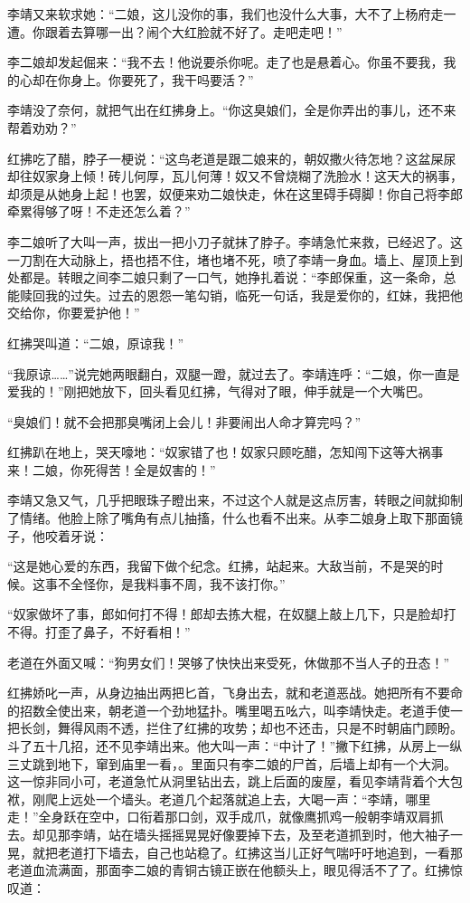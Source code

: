 李靖又来软求她：“二娘，这儿没你的事，我们也没什么大事，大不了上杨府走一遭。你跟着去算哪一出？闹个大红脸就不好了。走吧走吧！”

李二娘却发起倔来：“我不去！他说要杀你呢。走了也是悬着心。你虽不要我，我的心却在你身上。你要死了，我干吗要活？”

李靖没了奈何，就把气出在红拂身上。“你这臭娘们，全是你弄出的事儿，还不来帮着劝劝？”

红拂吃了醋，脖子一梗说：“这鸟老道是跟二娘来的，朝奴撒火待怎地？这盆屎尿却往奴家身上倾！砖儿何厚，瓦儿何薄！奴又不曾烧糊了洗脸水！这天大的祸事，却须是从她身上起！也罢，奴便来劝二娘快走，休在这里碍手碍脚！你自己将李郎牵累得够了呀！不走还怎么着？”

李二娘听了大叫一声，拔出一把小刀子就抹了脖子。李靖急忙来救，已经迟了。这一刀割在大动脉上，捂也捂不住，堵也堵不死，喷了李靖一身血。墙上、屋顶上到处都是。转眼之间李二娘只剩了一口气，她挣扎着说：“李郎保重，这一条命，总能赎回我的过失。过去的恩怨一笔勾销，临死一句话，我是爱你的，红妹，我把他交给你，你要爱护他！”

红拂哭叫道：“二娘，原谅我！”

“我原谅……”说完她两眼翻白，双腿一蹬，就过去了。李靖连呼：“二娘，你一直是爱我的！”刚把她放下，回头看见红拂，气得对了眼，伸手就是一个大嘴巴。

“臭娘们！就不会把那臭嘴闭上会儿！非要闹出人命才算完吗？”

红拂趴在地上，哭天嚎地：“奴家错了也！奴家只顾吃醋，怎知闯下这等大祸事来！二娘，你死得苦！全是奴害的！”

李靖又急又气，几乎把眼珠子瞪出来，不过这个人就是这点厉害，转眼之间就抑制了情绪。他脸上除了嘴角有点儿抽搐，什么也看不出来。从李二娘身上取下那面镜子，他咬着牙说：

“这是她心爱的东西，我留下做个纪念。红拂，站起来。大敌当前，不是哭的时候。这事不全怪你，是我料事不周，我不该打你。”

“奴家做坏了事，郎如何打不得！郎却去拣大棍，在奴腿上敲上几下，只是脸却打不得。打歪了鼻子，不好看相！”

老道在外面又喊：“狗男女们！哭够了快快出来受死，休做那不当人子的丑态！”

红拂娇叱一声，从身边抽出两把匕首，飞身出去，就和老道恶战。她把所有不要命的招数全使出来，朝老道一个劲地猛扑。嘴里喝五吆六，叫李靖快走。老道手使一把长剑，舞得风雨不透，拦住了红拂的攻势；却也不还击，只是不时朝庙门顾盼。斗了五十几招，还不见李靖出来。他大叫一声：“中计了！”撇下红拂，从房上一纵三丈跳到地下，窜到庙里一看，。里面只有李二娘的尸首，后墙上却有一个大洞。这一惊非同小可，老道急忙从洞里钻出去，跳上后面的废屋，看见李靖背着个大包袱，刚爬上远处一个墙头。老道几个起落就追上去，大喝一声：“李靖，哪里走！”全身跃在空中，口衔着那口剑，双手成爪，就像鹰抓鸡一般朝李靖双肩抓去。却见那李靖，站在墙头摇摇晃晃好像要掉下去，及至老道抓到时，他大袖子一晃，就把老道打下墙去，自己也站稳了。红拂这当儿正好气喘吁吁地追到，一看那老道血流满面，那面李二娘的青铜古镜正嵌在他额头上，眼见得活不了了。红拂惊叹道：

